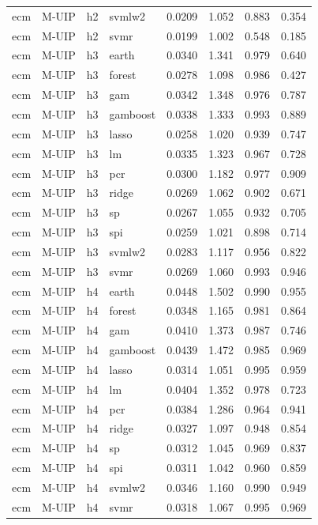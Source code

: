\begin{ThreePartTable}
\begin{longtable}[t]{llclcccc}
ecm & M-UIP & h2 & svmlw2 & 0.0209 & 1.052 & 0.883 & 0.354\\
ecm & M-UIP & h2 & svmr & 0.0199 & 1.002 & 0.548 & 0.185\\
\addlinespace
ecm & M-UIP & h3 & earth & 0.0340 & 1.341 & 0.979 & 0.640\\
ecm & M-UIP & h3 & forest & 0.0278 & 1.098 & 0.986 & 0.427\\
ecm & M-UIP & h3 & gam & 0.0342 & 1.348 & 0.976 & 0.787\\
ecm & M-UIP & h3 & gamboost & 0.0338 & 1.333 & 0.993 & 0.889\\
ecm & M-UIP & h3 & lasso & 0.0258 & 1.020 & 0.939 & 0.747\\
ecm & M-UIP & h3 & lm & 0.0335 & 1.323 & 0.967 & 0.728\\
ecm & M-UIP & h3 & pcr & 0.0300 & 1.182 & 0.977 & 0.909\\
ecm & M-UIP & h3 & ridge & 0.0269 & 1.062 & 0.902 & 0.671\\
ecm & M-UIP & h3 & sp & 0.0267 & 1.055 & 0.932 & 0.705\\
ecm & M-UIP & h3 & spi & 0.0259 & 1.021 & 0.898 & 0.714\\
ecm & M-UIP & h3 & svmlw2 & 0.0283 & 1.117 & 0.956 & 0.822\\
ecm & M-UIP & h3 & svmr & 0.0269 & 1.060 & 0.993 & 0.946\\
\addlinespace
ecm & M-UIP & h4 & earth & 0.0448 & 1.502 & 0.990 & 0.955\\
ecm & M-UIP & h4 & forest & 0.0348 & 1.165 & 0.981 & 0.864\\
ecm & M-UIP & h4 & gam & 0.0410 & 1.373 & 0.987 & 0.746\\
ecm & M-UIP & h4 & gamboost & 0.0439 & 1.472 & 0.985 & 0.969\\
ecm & M-UIP & h4 & lasso & 0.0314 & 1.051 & 0.995 & 0.959\\
ecm & M-UIP & h4 & lm & 0.0404 & 1.352 & 0.978 & 0.723\\
ecm & M-UIP & h4 & pcr & 0.0384 & 1.286 & 0.964 & 0.941\\
ecm & M-UIP & h4 & ridge & 0.0327 & 1.097 & 0.948 & 0.854\\
ecm & M-UIP & h4 & sp & 0.0312 & 1.045 & 0.969 & 0.837\\
ecm & M-UIP & h4 & spi & 0.0311 & 1.042 & 0.960 & 0.859\\
ecm & M-UIP & h4 & svmlw2 & 0.0346 & 1.160 & 0.990 & 0.949\\
ecm & M-UIP & h4 & svmr & 0.0318 & 1.067 & 0.995 & 0.969\\

\end{longtable}
\end{ThreePartTable}
